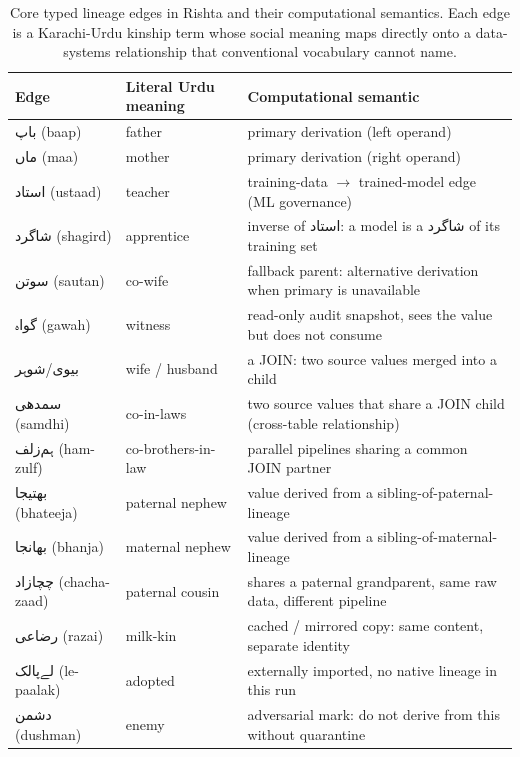 \documentclass[10pt,twocolumn]{article}
\newcommand{\ur}[1]{{\urdufont #1}}
\begin{document}
\begin{table}[t]
\centering
\small
\begin{tabular}{lll}
\hline
Edge & Literal Urdu meaning & Computational semantic \\
\hline
\ur{باپ} (baap) & father & primary derivation (left operand) \\
\ur{ماں} (maa) & mother & primary derivation (right operand) \\
\ur{استاد} (ustaad) & teacher & training-data $\to$ trained-model edge (ML governance) \\
\ur{شاگرد} (shagird) & apprentice & inverse of \ur{استاد}: a model is a \ur{شاگرد} of its training set \\
\ur{سوتن} (sautan) & co-wife & fallback parent: alternative derivation when primary is unavailable \\
\ur{گواہ} (gawah) & witness & read-only audit snapshot, sees the value but does not consume \\
\ur{بیوی}/\ur{شوہر} & wife / husband & a JOIN: two source values merged into a child \\
\ur{سمدھی} (samdhi) & co-in-laws & two source values that share a JOIN child (cross-table relationship) \\
\ur{ہم‌زلف} (ham-zulf) & co-brothers-in-law & parallel pipelines sharing a common JOIN partner \\
\ur{بھتیجا} (bhateeja) & paternal nephew & value derived from a sibling-of-paternal-lineage \\
\ur{بھانجا} (bhanja) & maternal nephew & value derived from a sibling-of-maternal-lineage \\
\ur{چچازاد} (chacha-zaad) & paternal cousin & shares a paternal grandparent, same raw data, different pipeline \\
\ur{رضاعی} (razai) & milk-kin & cached / mirrored copy: same content, separate identity \\
\ur{لے‌پالک} (le-paalak) & adopted & externally imported, no native lineage in this run \\
\ur{دشمن} (dushman) & enemy & adversarial mark: do not derive from this without quarantine \\
\hline
\end{tabular}
\caption{Core typed lineage edges in Rishta and their computational semantics. Each edge is a Karachi-Urdu kinship term whose social meaning maps directly onto a data-systems relationship that conventional vocabulary cannot name.}
\label{tab:edges}
\end{table}
\end{document}
